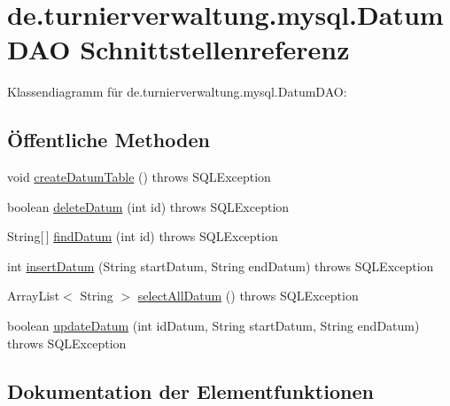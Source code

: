 \hypertarget{interfacede_1_1turnierverwaltung_1_1mysql_1_1_datum_d_a_o}{}\section{de.\+turnierverwaltung.\+mysql.\+Datum\+D\+AO Schnittstellenreferenz}
\label{interfacede_1_1turnierverwaltung_1_1mysql_1_1_datum_d_a_o}


Klassendiagramm für de.\+turnierverwaltung.\+mysql.\+Datum\+D\+AO\+:
\subsection*{Öffentliche Methoden}
\begin{DoxyCompactItemize}
\item 
void \hyperlink{interfacede_1_1turnierverwaltung_1_1mysql_1_1_datum_d_a_o_a4f526b8fafff38ba1277e6579da9a1b9}{create\+Datum\+Table} ()  throws S\+Q\+L\+Exception
\item 
boolean \hyperlink{interfacede_1_1turnierverwaltung_1_1mysql_1_1_datum_d_a_o_af8650c0289f1cb449e940fb65dde3747}{delete\+Datum} (int id)  throws S\+Q\+L\+Exception
\item 
String\mbox{[}$\,$\mbox{]} \hyperlink{interfacede_1_1turnierverwaltung_1_1mysql_1_1_datum_d_a_o_a008c60b68758763422e5ae8d3612999e}{find\+Datum} (int id)  throws S\+Q\+L\+Exception
\item 
int \hyperlink{interfacede_1_1turnierverwaltung_1_1mysql_1_1_datum_d_a_o_a14dd10fe19d225cb987fdb2b4f64be4a}{insert\+Datum} (String start\+Datum, String end\+Datum)  throws S\+Q\+L\+Exception
\item 
Array\+List$<$ String $>$ \hyperlink{interfacede_1_1turnierverwaltung_1_1mysql_1_1_datum_d_a_o_accd15a927648b3453796df40ceb0da1f}{select\+All\+Datum} ()  throws S\+Q\+L\+Exception
\item 
boolean \hyperlink{interfacede_1_1turnierverwaltung_1_1mysql_1_1_datum_d_a_o_a0fcdda6235588ca192cfda364ae86a8e}{update\+Datum} (int id\+Datum, String start\+Datum, String end\+Datum)  throws S\+Q\+L\+Exception
\end{DoxyCompactItemize}


\subsection{Dokumentation der Elementfunktionen}
